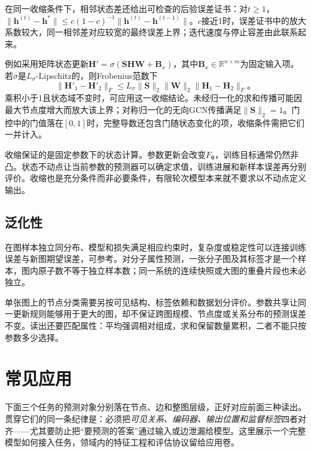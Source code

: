 在同一收缩条件下，相邻状态差还给出可检查的后验误差证书：对$t\geq1$，$\lVert\bm{h}^{(t)}-\bm{h}^*\rVert\leq c(1-c)^{-1}\lVert\bm{h}^{(t)}-\bm{h}^{(t-1)}\rVert$。$c$接近1时，误差证书中的放大系数较大，同一相邻差对应较宽的最终误差上界；迭代速度与停止容差由此联系起来。

例如采用矩阵状态更新$\bm{H}'=\sigma(\bm{S}\bm{H}\bm{W}+\bm{B}_x)$，其中$\bm{B}_x\in\mathbb{R}^{n\times m}$为固定输入项。若$\sigma$是$L_\sigma$-Lipschitz的，则Frobenius范数下
\begin{equation}
  \lVert\bm{H}'_1-\bm{H}'_2\rVert_F
    \leq L_\sigma\lVert\bm{S}\rVert_2\lVert\bm{W}\rVert_2
      \lVert\bm{H}_1-\bm{H}_2\rVert_F\text{。}
  \label{eq:gnn-state-lipschitz}
\end{equation}
乘积小于1且状态域不变时，可应用这一收缩结论。未经归一化的求和传播可能因最大节点度增大而放大该上界；对称归一化的无向GCN传播满足$\lVert\bm{S}\rVert_2=1$。门控中的门值落在$[0,1]$时，完整导数还包含门随状态变化的项，收缩条件需把它们一并计入。

收缩保证的是固定参数下的状态计算。参数更新会改变$F_{\bm{\theta}}$，训练目标通常仍然非凸。状态不动点让当前参数的预测器可以确定求值，训练进展和新样本误差再分别评价。收缩也是充分条件而非必要条件，有限轮次模型本来就不要求以不动点定义输出。


\subsection{泛化性}
\label{sec:gnn-generalization}

在图样本独立同分布、模型和损失满足相应约束时，复杂度或稳定性可以连接训练误差与新图期望误差，可参考。对分子属性预测，一张分子图及其标签才是一个样本，图内原子数不等于独立样本数；同一系统的连续快照或大图的重叠片段也未必独立。

单张图上的节点分类需要另按可见结构、标签依赖和数据划分评价。参数共享让同一更新规则能够用于更大的图，却不保证跨图规模、节点度或关系分布的预测误差不变。读出还要匹配属性：平均强调相对组成，求和保留数量累积，二者不能只按参数多少选择。

\section{常见应用}
\label{sec:gnn-applications}

下面三个任务的预测对象分别落在节点、边和整图层级，正好对应前面三种读出。贯穿它们的同一条纪律是：必须把\emph{可见关系、编码器、输出位置和监督标签}四者对齐——尤其要防止把“要预测的答案”通过输入或边泄漏给模型。这里展示一个完整模型如何接入任务，领域内的特征工程和评估协议留给应用卷。

